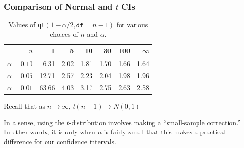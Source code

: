 \begin{frame}
\frametitle{Comparison of Normal and $t$ CIs}
\begin{table}
\caption{Values of \texttt{qt}$(1-\alpha/2, \texttt{df}=n-1)$ for various choices of $n$ and $\alpha$. }
\begin{tabular}{r|rrrrr|r}
\hline
$n$& 1& 5& 10& 30& 100 & $\infty$\\
\hline
$\alpha = 0.10$&  6.31& 2.02 & 1.81 & 1.70  & 1.66 &1.64\\
$\alpha = 0.05$ & 12.71& 2.57 & 2.23 & 2.04  & 1.98 &1.96\\
$\alpha = 0.01$ & 63.66& 4.03 & 3.17 & 2.75  & 2.63 &2.58\\
\hline
\end{tabular}
\end{table}
\alert{Recall that as $n\rightarrow \infty$, $t(n-1) \rightarrow N(0,1)$}
\vspace{1em}


In a sense, using the $t$-distribution involves making a ``small-sample correction.'' In other words, it is only when $n$ is fairly small that this makes a practical difference for our confidence intervals.
\end{frame}


